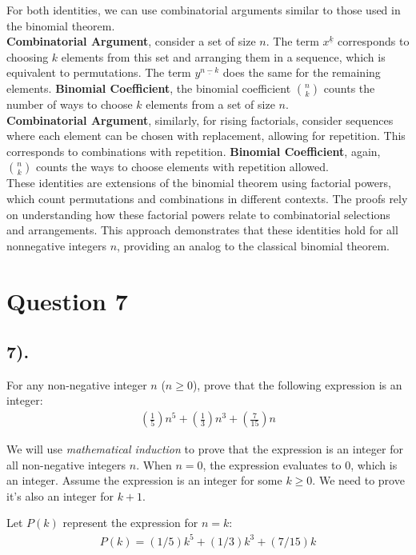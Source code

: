 \documentclass[12pt]{article}
\begin{document}
For both identities, we can use combinatorial arguments similar to those used in the binomial theorem. \\

\textbf{Combinatorial Argument}, consider a set of size \(n\). The term \(x^{\underline{k}}\) corresponds to choosing \(k\) elements from this set and arranging them in a sequence, which is equivalent to permutations.
The term \(y^{\underline{n-k}}\) does the same for the remaining elements.
\textbf{Binomial Coefficient}, the binomial coefficient \(\binom{n}{k}\) counts the number of ways to choose \(k\) elements from a set of size \(n\). \\

\textbf{Combinatorial Argument}, similarly, for rising factorials, consider sequences where each element can be chosen with replacement, allowing for repetition. This corresponds to combinations with repetition.
\textbf{Binomial Coefficient}, again, \(\binom{n}{k}\) counts the ways to choose elements with repetition allowed. \\

These identities are extensions of the binomial theorem using factorial powers, which count permutations and combinations in different contexts. The proofs rely on understanding how these factorial powers relate to combinatorial selections and arrangements.
This approach demonstrates that these identities hold for all nonnegative integers \(n\), providing an analog to the classical binomial theorem.

\section*{Question 7}
\subsection*{7).}
For any non-negative integer $n$ ($n \geq 0$), prove that the following expression is an integer:
\begin{gather*}
    (\frac{1}{5})n^5 + (\frac{1}{3})n^3 + (\frac{7}{15})n
\end{gather*}

We will use \textit{mathematical induction} to prove that the expression is an integer for all non-negative integers $n$.
When $n = 0$, the expression evaluates to 0, which is an integer.
Assume the expression is an integer for some $k \geq 0$. We need to prove it's also an integer for $k + 1$.

Let $P(k)$ represent the expression for $n = k$:
\begin{gather*}
    P(k) = (1/5)k^5 + (1/3)k^3 + (7/15)k
\end{gather*}
\end{document}
